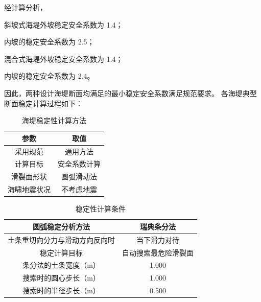 \documentclass[UTF8, a4paper, 12pt]{ctexart} %
\begin{document}
经计算分析，

斜坡式海堤外坡稳定安全系数为 1.4；

内坡的稳定安全系数为 2.5；

混合式海堤外坡稳定安全系数为 1.4；

内坡的稳定安全系数为 2.4。

因此，两种设计海堤断面均满足的最小稳定安全系数满足规范要求。
各海堤典型断面稳定计算过程如下：



\newpage
\begin{table}[h]
    \centering
    \caption{海堤稳定性计算方法}
    \begin{tabular}{|c|c|}
        \hline
        \textbf{参数} & \textbf{取值} \\ \hline
        采用规范 & 通用方法 \\ \hline
        计算目标 & 安全系数计算 \\ \hline
        滑裂面形状 & 圆弧滑动法 \\ \hline
        海啸地震状况 & 不考虑地震 \\ \hline
    \end{tabular}
    \label{tab:stability_parameters}
\end{table}

\begin{table}[h]
    \centering
    \caption{稳定性计算条件}
    \begin{tabular}{|c|c|}
        \hline
        \textbf{圆弧稳定分析方法} & \textbf{瑞典条分法} \\ \hline
        土条重切向分力与滑动方向反向时 & 当下滑力对待 \\ \hline
        稳定计算目标 & 自动搜索最危险滑裂面 \\ \hline
        条分法的土条宽度（m） & 1.000 \\ \hline
        搜索时的圆心步长（m） & 1.000 \\ \hline
        搜索时的半径步长（m） & 0.500 \\ \hline
    \end{tabular}
    \label{tab:stability_analysis}
\end{table}
\end{document}
